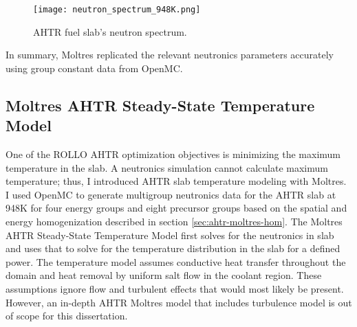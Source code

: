  \begin{figure}[H]
    \centering
    \texttt{[image: neutron\_spectrum\_948K.png]}
    \caption{AHTR fuel slab's neutron spectrum.}  
    \label{fig:neutron_spectrum_948K}
\end{figure}

In summary, Moltres replicated the relevant neutronics parameters accurately 
using group constant data from OpenMC. %

\subsection{Moltres AHTR Steady-State Temperature Model}
\label{sec:ahtr-moltres-model}
One of the ROLLO AHTR optimization objectives is minimizing the maximum 
temperature in the slab. 
A neutronics simulation cannot calculate maximum temperature; thus, I introduced 
AHTR slab temperature modeling with Moltres.
I used OpenMC to generate multigroup neutronics data for the AHTR slab at 948K 
for four energy groups and eight precursor groups based on the spatial and 
energy homogenization described in section \ref{sec:ahtr-moltres-hom}.
The Moltres AHTR Steady-State Temperature Model first solves for the neutronics 
in slab and uses that to solve for the temperature distribution in the slab 
for a defined power. 
The temperature model assumes conductive heat transfer throughout the domain 
and heat removal by uniform salt flow in the coolant region. 
These assumptions ignore flow and turbulent effects that would most likely be 
present. 
However, an in-depth AHTR Moltres model that includes turbulence model is 
out of scope for this dissertation. 

